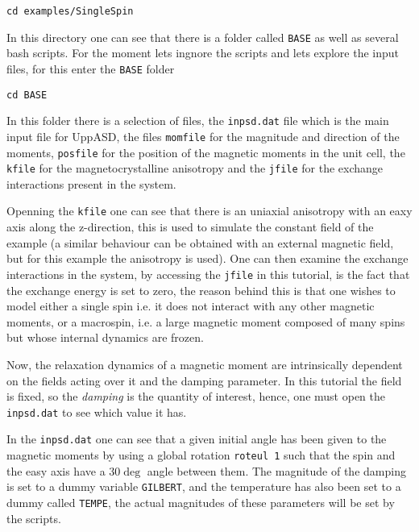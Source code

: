 \documentclass[11pt,fleqn,a4]{book} %
\begin{document}
\begin{fBox} 
\begin{Verbatim}
cd examples/SingleSpin
\end{Verbatim}
\end{fBox}

In this directory one can see that there is a folder called \verb;BASE; as well as several bash scripts. For the moment lets ingnore the scripts and lets explore the input files, for this enter the \verb;BASE; folder

\begin{fBox} 
\begin{Verbatim}
cd BASE
\end{Verbatim}
\end{fBox}

In this folder there is a selection of files, the \verb;inpsd.dat; file which is the main input file for UppASD, the files \verb;momfile; for the magnitude and direction of the moments, \verb;posfile; for the position of the magnetic moments in the unit cell, the \verb;kfile; for the magnetocrystalline anisotropy and the \verb;jfile; for the exchange interactions present in the system.

Openning the \verb;kfile; one can see that there is an uniaxial anisotropy with an eaxy axis along the z-direction, this is used to simulate the constant field of the example (a similar behaviour can be obtained with an external magnetic field, but for this example the anisotropy is used). One can then examine the exchange interactions in the system, by accessing the \verb;jfile; in this tutorial, is the fact that the exchange energy is set to zero, the reason behind this is that one wishes to model either a single spin i.e. it does not interact with any other magnetic moments, or a macrospin, i.e. a large magnetic moment composed of many spins but whose internal dynamics are frozen.

Now, the relaxation dynamics of a magnetic moment are intrinsically dependent on the fields acting over it and the damping parameter. In this tutorial the field is fixed, so the \textit{damping} is the quantity of interest, hence, one must open the \verb;inpsd.dat; to see which value it has. 

In the \verb;inpsd.dat; one can see that a given initial angle has been given to the magnetic moments by using a global rotation \verb;roteul 1; such that the spin and the easy axis have a $30\deg$ angle between them. The magnitude of the damping is set to a dummy variable \verb;GILBERT;, and the temperature has also been set to a dummy called \verb;TEMPE;, the actual magnitudes of these parameters will be set by the scripts.
\end{document}
